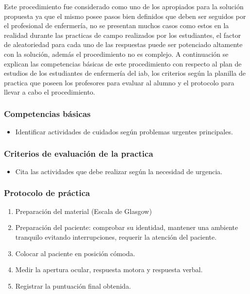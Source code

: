 Este procedimiento fue considerado como uno de los apropiados para la solución propuesta ya que el mismo
posee pasos bien definidos que deben ser seguidos por el profesional de enfermería, no se presentan
muchos casos como estos en la realidad durante las practicas de campo realizados por los estudiantes,
el factor de aleatoriedad para cada uno de las respuestas puede ser potenciado altamente con la solución,
además el procedimiento no es complejo. A continuación se explican las competencias básicas de este
procedimiento con respecto al plan de estudios de los estudiantes de enfermería del \Gls{iab}, los criterios
según la planilla de practica que poseen los profesores para evaluar al alumno y el protocolo para llevar a 
cabo el procedimiento.

\subsubsection{Competencias básicas}
\begin{itemize}
\item Identificar actividades de cuidados según problemas urgentes principales.
\end{itemize}

\subsubsection{Criterios de evaluación de la practica}
\begin{itemize}
\item Cita las actividades que debe realizar según la necesidad de urgencia. 
\end{itemize}


\subsubsection{Protocolo de práctica}

\begin{enumerate}
\item Preparación del material (Escala de Glasgow)
\item Preparación del paciente: comprobar su identidad, mantener una ambiente tranquilo evitando interrupciones, 
requerir la atención del paciente.
\item Colocar al paciente en posición cómoda.
\item Medir la apertura ocular, respuesta motora y respuesta verbal.
\item Registrar la puntuación final obtenida.
\end{enumerate}

